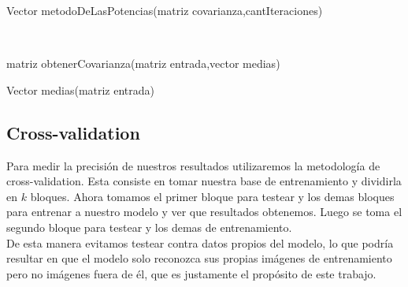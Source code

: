\begin{algorithm}
\begin{algorithmic}[1]\parskip=1mm
\caption{Vector metodoDeLasPotencias(matriz covarianza,cantIteraciones)}
\ENDFOR\\
\end{algorithmic}
\end{algorithm}

\begin{algorithm}
\begin{algorithmic}[1]\parskip=1mm
\caption{matriz obtenerCovarianza(matriz entrada,vector medias)}
	\ENDFOR
\ENDFOR
{}
	\ENDFOR
\ENDFOR
{}
\end{algorithmic}
\end{algorithm}


\begin{algorithm}
\begin{algorithmic}[1]\parskip=1mm
\caption{Vector medias(matriz entrada)}
	\ENDFOR
\ENDFOR
{}
\end{algorithmic}
\end{algorithm}

\subsection{Cross-validation}
Para medir la precisión de nuestros resultados utilizaremos la metodología de cross-validation. Esta consiste en tomar nuestra base de entrenamiento y dividirla en $k$ bloques. Ahora tomamos el primer bloque para testear y los demas bloques para entrenar a nuestro modelo y ver que resultados obtenemos. Luego se toma el segundo bloque para testear y los demas de entrenamiento.
\\
De esta manera evitamos testear contra datos propios del modelo, lo que podría resultar en que el modelo solo reconozca sus propias imágenes de entrenamiento pero no imágenes fuera de él, que es justamente el propósito de este trabajo.
